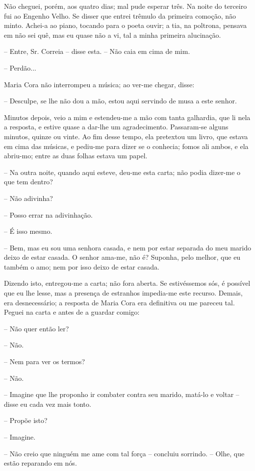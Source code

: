 Não cheguei, porém, aos quatro dias; mal pude esperar três. Na noite do
terceiro fui ao Engenho Velho. Se disser que entrei trêmulo da primeira
comoção, não minto. Achei-a ao piano, tocando para o poeta ouvir; a tia,
na poltrona, pensava em não sei quê, mas eu quase não a vi, tal a minha
primeira alucinação.

-- Entre, Sr. Correia -- disse esta. -- Não caia em cima de mim.

-- Perdão...

Maria Cora não interrompeu a música; ao ver-me chegar, disse:

-- Desculpe, se lhe não dou a mão, estou aqui servindo de musa a este
senhor.

Minutos depois, veio a mim e estendeu-me a mão com tanta galhardia, que
li nela a resposta, e estive quase a dar-lhe um agradecimento.
Passaram-se alguns minutos, quinze ou vinte. Ao fim desse tempo, ela
pretextou um livro, que estava em cima das músicas, e pediu-me para
dizer se o conhecia; fomos ali ambos, e ela abriu-mo; entre as duas
folhas estava um papel.

-- Na outra noite, quando aqui esteve, deu-me esta carta; não podia
dizer-me o que tem dentro?

-- Não adivinha?

-- Posso errar na adivinhação.

-- É isso mesmo.

-- Bem, mas eu sou uma senhora casada, e nem por estar separada do meu
marido deixo de estar casada. O senhor ama-me, não é? Suponha, pelo
melhor, que eu também o amo; nem por isso deixo de estar casada.

Dizendo isto, entregou-me a carta; não fora aberta. Se estivéssemos sós,
é possível que eu lhe lesse, mas a presença de estranhos impedia-me este
recurso. Demais, era desnecessário; a resposta de Maria Cora era
definitiva ou me pareceu tal. Peguei na carta e antes de a guardar
comigo:

-- Não quer então ler?

-- Não.

-- Nem para ver os termos?

-- Não.

-- Imagine que lhe proponho ir combater contra seu marido, matá-lo e
voltar -- disse eu cada vez mais tonto.

-- Propõe isto?

-- Imagine.

-- Não creio que ninguém me ame com tal força -- concluiu sorrindo. --
Olhe, que estão reparando em nós.

